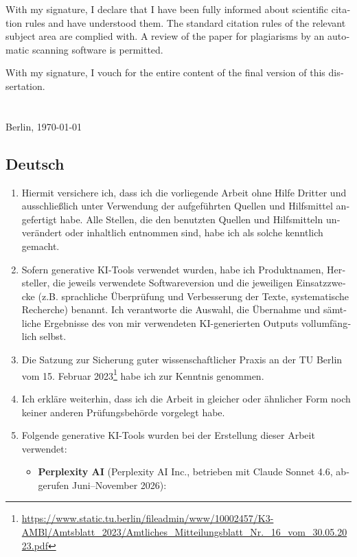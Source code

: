 {\begin{otherlanguage}{english}
With my signature, I declare that I have been fully informed about scientific citation rules and have understood them. The standard citation rules of the relevant subject area are complied with. A review of the paper for plagiarisms by an automatic scanning software is permitted. 

With my signature, I vouch for the entire content of the final version of this dissertation.\\[2cm]
\makebox[2.5in][l]{\hrulefill}\\
\textsc{\autor} \\
Berlin, \today 
\end{otherlanguage}
}{%
\begin{otherlanguage}{ngerman}
\section*{Deutsch}
\begin{enumerate}[noitemsep]
\item Hiermit versichere ich, dass ich die vorliegende Arbeit ohne Hilfe Dritter und ausschließlich unter Verwendung der aufgeführten Quellen und Hilfsmittel angefertigt habe. Alle Stellen, die den benutzten Quellen und Hilfsmitteln unverändert oder inhaltlich entnommen sind, habe ich als solche kenntlich gemacht.
\item Sofern generative KI-Tools verwendet wurden, habe ich Produktnamen, Hersteller, die jeweils verwendete Softwareversion und die jeweiligen Einsatzzwecke (z.B. sprachliche Überprüfung und Verbesserung der Texte, systematische Recherche) benannt. Ich verantworte die Auswahl, die Übernahme und sämtliche Ergebnisse des von mir verwendeten KI-generierten Outputs vollumfänglich selbst.
\item Die Satzung zur Sicherung guter wissenschaftlicher Praxis an der TU Berlin vom 15. Februar 2023\footnote{\url{https://www.static.tu.berlin/fileadmin/www/10002457/K3-AMBl/Amtsblatt_2023/Amtliches_Mitteilungsblatt_Nr._16_vom_30.05.2023.pdf}} habe ich zur Kenntnis genommen.
\item Ich erkläre weiterhin, dass ich die Arbeit in gleicher oder ähnlicher Form noch keiner anderen Prüfungsbehörde vorgelegt habe.
\item Folgende generative KI-Tools wurden bei der Erstellung dieser Arbeit verwendet:
\begin{itemize}
	\item \textbf{Perplexity AI} (Perplexity AI Inc., betrieben mit Claude Sonnet 4.6, abgerufen Juni--November 2026):

\end{itemize}
\end{enumerate}
\end{otherlanguage}}
